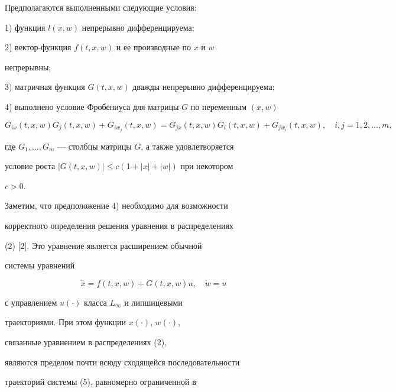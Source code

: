 Предполагаются выполненными следующие условия:





1) функция $l(x,w)$ непрерывно дифференцируема;





2) вектор-функция $f(t,x,w)$ и ее производные по $x$ и $w$


непрерывны;





3) матричная функция $G(t,x,w)$ дважды непрерывно дифференцируема;





4) выполнено условие Фробениуса для матрицы $G$ по переменным $(x,w)$


$$


G_{ix}(t,x,w) G_j(t,x,w)+G_{iw_j}(t,x,w)=


G_{jx}(t,x,w) G_i(t,x,w)+G_{jw_i}(t,x,w), \quad i,j=1,2,\dotsc,m,


$$


где $G_1,\dotsc, G_m$ --- столбцы матрицы $G$, а также удовлетворяется 


условие роста $| G(t,x,w)| \leq c(1+|x| +|w|)$ при некотором


$c>0$.


 


Заметим, что предположение 4) необходимо для возможности 


корректного определения решения уравнения в распределениях 


(2) [2]. Это уравнение является расширением обычной


системы уравнений


\begin{equation}


\Dot{x}=f(t,x,w)+G(t,x,w)u,\quad \Dot{w}=u


\end{equation}


с управлением $u(\cdot)$ класса $L_\infty$ и липшицевыми 


траекториями. При этом функции $x(\cdot)$, $w(\cdot)$, 


связанные уравнением в распределениях (2), 


являются пределом почти всюду сходящейся последовательности 


траекторий системы (5), равномерно ограниченной в


